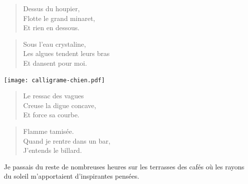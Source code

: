 \begin{verse}\haiku
  Dessus du houpier,\\  %
  Flotte le grand minaret,\\  %
  Et rien en dessous.
\end{verse}

\begin{verse}\haiku
  Sous l’eau crystaline,\\  %
  Les algues tendent leurs bras\\  %
  Et dansent pour moi.
\end{verse}

\begin{floatpoem}
  \calligramme
  \vspace{-1cm}
  \texttt{[image: calligrame-chien.pdf]}
\end{floatpoem}

\begin{verse}\haiku
  Le ressac des vagues\\  %
  Creuse la digue concave,\\  %
  Et force sa courbe.
\end{verse}

\begin{verse}\haiku
  Flamme tamisée.\\  %
  Quand je rentre dans un bar,\\  %
  J’entends le billard.
\end{verse}



\begin{prose}
  Je passais du reste de nombreuses heures sur les terrasses des cafés où les rayons du soleil m’apportaient d’inspirantes pensées.
\end{prose}

